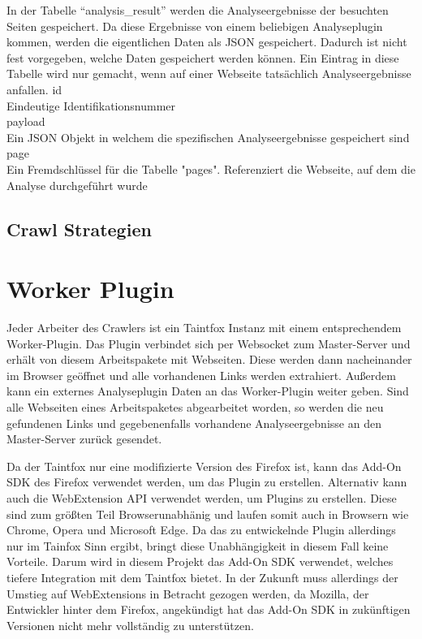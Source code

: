 In der Tabelle "`analysis\_result"' werden die Analyseergebnisse der besuchten Seiten gespeichert. Da diese Ergebnisse von einem beliebigen Analyseplugin kommen, werden die eigentlichen Daten als JSON gespeichert. Dadurch ist nicht fest vorgegeben, welche Daten gespeichert werden können. Ein Eintrag in diese Tabelle wird nur gemacht, wenn auf einer Webseite tatsächlich Analyseergebnisse anfallen.
id \\
Eindeutige Identifikationsnummer \\
payload \\
Ein JSON Objekt in welchem die spezifischen Analyseergebnisse gespeichert sind \\
page \\
Ein Fremdschlüssel für die Tabelle "pages". Referenziert die Webseite, auf dem die Analyse durchgeführt wurde \\

\subsection{Crawl Strategien}
\section{Worker Plugin}
Jeder Arbeiter des Crawlers ist ein Taintfox Instanz mit einem entsprechendem Worker-Plugin. Das Plugin verbindet sich per Websocket zum Master-Server und erhält von diesem Arbeitspakete mit Webseiten. Diese werden dann nacheinander im Browser geöffnet und alle vorhandenen Links werden extrahiert. Außerdem kann ein externes Analyseplugin Daten an das Worker-Plugin weiter geben. Sind alle Webseiten eines Arbeitspaketes abgearbeitet worden, so werden die neu gefundenen Links und gegebenenfalls vorhandene Analyseergebnisse an den Master-Server zurück gesendet.

Da der Taintfox nur eine modifizierte Version des Firefox ist, kann das Add-On SDK des Firefox verwendet werden, um das Plugin zu erstellen. Alternativ kann auch die WebExtension API verwendet werden, um Plugins zu erstellen. Diese sind zum größten Teil Browserunabhänig und laufen somit auch in Browsern wie Chrome, Opera und Microsoft Edge. Da das zu entwickelnde Plugin allerdings nur im Tainfox Sinn ergibt, bringt diese Unabhängigkeit in diesem Fall keine Vorteile. Darum wird in diesem Projekt das Add-On SDK verwendet, welches tiefere Integration mit dem Taintfox bietet. In der Zukunft muss allerdings der Umstieg auf WebExtensions in Betracht gezogen werden, da Mozilla, der Entwickler hinter dem Firefox, angekündigt hat das Add-On SDK in zukünftigen Versionen nicht mehr vollständig zu unterstützen.

